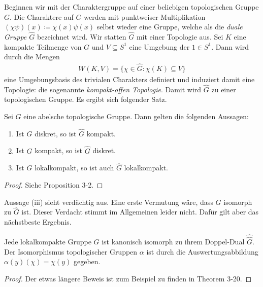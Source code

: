 	Beginnen wir mit der Charaktergruppe auf einer beliebigen topologischen Gruppe $G$.
	Die Charaktere auf $G$ werden mit punktweiser Multiplikation $(\chi\psi) (x) \coloneqq \chi(x) \psi (x)$ selbst wieder eine Gruppe, welche als die \emph{duale Gruppe $\hat{G}$} bezeichnet wird.
	Wir statten $\hat{G}$ mit einer Topologie aus.
	Sei $K$ eine kompakte Teilmenge von $G$ und $V\subseteq S^1$ eine Umgebung der $1\in S^1$.
	Dann wird durch die Mengen
	\begin{align*}
		W(K, V) = \{ \chi\in \hat{G}: \chi(K) \subseteq V \}
	\end{align*}
	eine Umgebungsbasis des trivialen Charakters definiert und induziert damit eine Topologie: die sogenannte \emph{kompakt-offen Topologie}.
	Damit wird $\hat{G}$ zu einer topologischen Gruppe.
	Es ergibt sich folgender Satz.
	\begin{satz} 
		Sei $G$ eine abelsche topologische Gruppe. 
		Dann gelten die folgenden Aussagen:
		\begin{enumerate}[label=(\roman*)]
			\item Ist $G$ diskret, so ist $\hat{G}$ kompakt.
			\item Ist $G$ kompakt, so ist $\hat{G}$ diskret.
			\item Ist $G$ lokalkompakt, so ist auch $\hat{G}$ lokalkompakt.
		\end{enumerate}
	\end{satz}
	\begin{proof}
		Siehe \textcite{rama} Proposition 3-2.
	\end{proof}
	Aussage (iii) sieht verdächtig aus.
	Eine erste Vermutung wäre, dass $G$ isomorph zu $\hat{G}$ ist.
	Dieser Verdacht stimmt im Allgemeinen leider nicht. 
	Dafür gilt aber das nächstbeste Ergebnis.
	\begin{satz}
		Jede lokalkompakte Gruppe $G$ ist kanonisch isomorph zu ihrem Doppel-Dual $\hat{\hat{G}}$.
		Der Isomorphismus topologischer Gruppen $\alpha$ ist durch die Auswertungsabbildung $\alpha(y)(\chi) = \chi(y)$ gegeben.
	\end{satz}
	\begin{proof}
		Der etwas längere Beweis ist zum Beispiel zu finden in \textcite{rama} Theorem 3-20.
	\end{proof}
	
